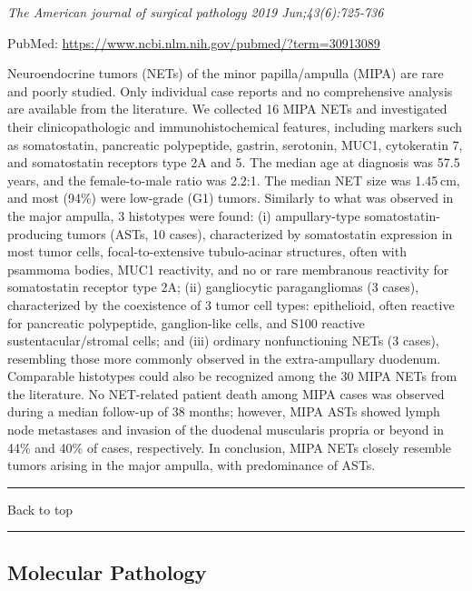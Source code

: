 \documentclass[]{article}
\begin{document}
\emph{The American journal of surgical pathology 2019 Jun;43(6):725-736}

PubMed: \url{https://www.ncbi.nlm.nih.gov/pubmed/?term=30913089}

Neuroendocrine tumors (NETs) of the minor papilla/ampulla (MIPA) are
rare and poorly studied. Only individual case reports and no
comprehensive analysis are available from the literature. We collected
16 MIPA NETs and investigated their clinicopathologic and
immunohistochemical features, including markers such as somatostatin,
pancreatic polypeptide, gastrin, serotonin, MUC1, cytokeratin 7, and
somatostatin receptors type 2A and 5. The median age at diagnosis was
57.5 years, and the female-to-male ratio was 2.2:1. The median NET size
was 1.45 cm, and most (94\%) were low-grade (G1) tumors. Similarly to
what was observed in the major ampulla, 3 histotypes were found: (i)
ampullary-type somatostatin-producing tumors (ASTs, 10 cases),
characterized by somatostatin expression in most tumor cells,
focal-to-extensive tubulo-acinar structures, often with psammoma bodies,
MUC1 reactivity, and no or rare membranous reactivity for somatostatin
receptor type 2A; (ii) gangliocytic paragangliomas (3 cases),
characterized by the coexistence of 3 tumor cell types: epithelioid,
often reactive for pancreatic polypeptide, ganglion-like cells, and S100
reactive sustentacular/stromal cells; and (iii) ordinary nonfunctioning
NETs (3 cases), resembling those more commonly observed in the
extra-ampullary duodenum. Comparable histotypes could also be recognized
among the 30 MIPA NETs from the literature. No NET-related patient death
among MIPA cases was observed during a median follow-up of 38 months;
however, MIPA ASTs showed lymph node metastases and invasion of the
duodenal muscularis propria or beyond in 44\% and 40\% of cases,
respectively. In conclusion, MIPA NETs closely resemble tumors arising
in the major ampulla, with predominance of ASTs.

{}

{}

\begin{center}\rule{0.5\linewidth}{\linethickness}\end{center}

Back to top

\begin{center}\rule{0.5\linewidth}{\linethickness}\end{center}

\pagebreak

\hypertarget{molecular-pathology}{%
\subsection{Molecular Pathology}\label{molecular-pathology}}
\end{document}
